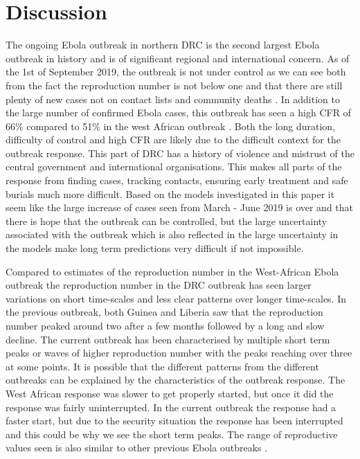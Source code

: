 \documentclass[12pt]{article}
\begin{document}
\section{Discussion}


The ongoing Ebola outbreak in northern DRC is the second largest Ebola outbreak in history and is of significant regional and international concern. As of the 1st of September 2019, the outbreak is not under control as we can see both from the fact the reproduction number is not below one and that there are still plenty of new cases not on contact lists and community deaths \cite{worldhealthorganisationDiseaseOutbreakNews}. In addition to the large number of confirmed Ebola cases, this outbreak has seen a high CFR of 66\% compared to 51\% in the west African outbreak \cite{rojekSystematicReviewMetaanalysis2019}. Both the long duration, difficulty of control and high CFR are likely due to the difficult context for the outbreak response. This part of DRC has a history of violence and mistrust of the central government and international organisations. This makes all parts of the response from finding cases, tracking contacts, ensuring early treatment and safe burials much more difficult. Based on the models investigated in this paper it seem like the large increase of cases seen from March - June 2019 is over and that there is hope that the outbreak can be controlled, but the large uncertainty associated with the outbreak which is also reflected in the large uncertainty in the models make long term predictions very difficult if not impossible.

Compared to estimates of the reproduction number in the West-African Ebola outbreak \cite{WestAfricanEbola2015} the reproduction number in the DRC outbreak has seen larger variations on short time-scales and less clear patterns over longer time-scales. In the previous outbreak, both Guinea and Liberia saw that the reproduction number peaked around two after a few months followed by a long and slow decline. The current outbreak has been characterised by multiple short term peaks or waves of higher reproduction number with the peaks reaching over three at some points. It is possible that the different patterns from the different outbreaks can be explained by the characteristics of the outbreak response. The West African response was slower to get properly started, but once it did the response was fairly uninterrupted. In the current outbreak the response had a faster start, but due to the security situation the response has been interrupted and this could be why we see the short term peaks. The range of reproductive values seen is also similar to other previous Ebola outbreaks \cite{legrandUnderstandingDynamicsEbola2007}.
\end{document}
